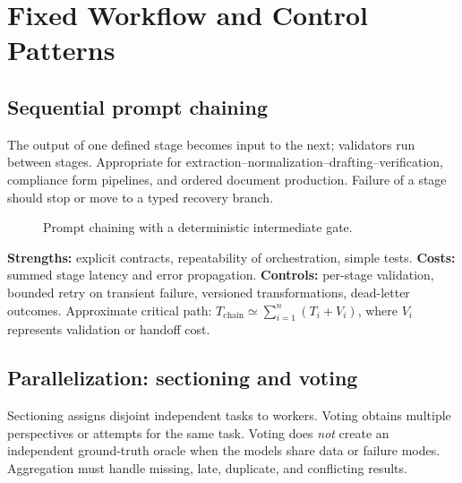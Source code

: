 
\section{Fixed Workflow and Control Patterns}
\subsection{Sequential prompt chaining}
The output of one defined stage becomes input to the next; validators run between stages. Appropriate for extraction--normalization--drafting--verification, compliance form pipelines, and ordered document production. Failure of a stage should stop or move to a typed recovery branch.

\begin{figure}[htbp]\centering
{}
\caption{Prompt chaining with a deterministic intermediate gate.}
\label{fig:chaining}
\end{figure}

\textbf{Strengths:} explicit contracts, repeatability of orchestration, simple tests. \textbf{Costs:} summed stage latency and error propagation. \textbf{Controls:} per-stage validation, bounded retry on transient failure, versioned transformations, dead-letter outcomes. Approximate critical path: $T_{\mathrm{chain}}\simeq\sum_{i=1}^{n}(T_i+V_i)$, where $V_i$ represents validation or handoff cost.

\subsection{Parallelization: sectioning and voting}
Sectioning assigns disjoint independent tasks to workers. Voting obtains multiple perspectives or attempts for the same task. Voting does \emph{not} create an independent ground-truth oracle when the models share data or failure modes. Aggregation must handle missing, late, duplicate, and conflicting results.

